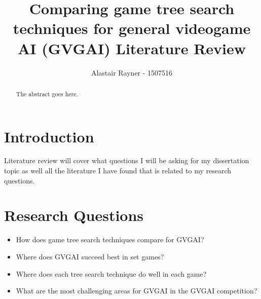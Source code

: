 \documentclass[journal]{IEEEtran}
\begin{document}
%
\title{Comparing game tree search techniques for general videogame AI (GVGAI) Literature Review}
%
%
\author{Alastair Rayner - 1507516}


\maketitle

\begin{abstract}
The abstract goes here.
\end{abstract}

\section{Introduction}
 Literature review will cover what questions I will be asking for my dissertation topic as well all the literature I have found that is related to my research questions.




\section{Research Questions}

\begin{itemize}
    \item How does game tree search techniques compare for GVGAI?
    \item Where does GVGAI succeed best in set games?
    \item Where does each tree search technique do well in each game?
    \item What are the most challenging areas for GVGAI in the GVGAI competition?
\end{itemize}
\end{document}
